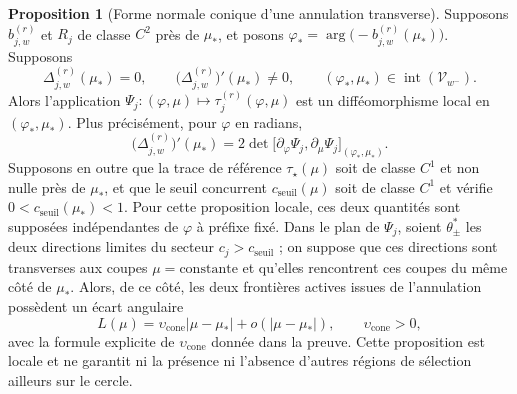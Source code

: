 \documentclass[11pt,a4paper]{article}
\theoremstyle{definition}
\newtheorem{propositionthm}[definition]{Proposition}
\theoremstyle{remark}
\begin{document}
\begin{propositionthm}[Forme normale conique d'une annulation transverse]
\label{prop:annulation-conique}
Supposons $b_{j,w}^{(r)}$ et $R_j$ de classe $C^2$ près de $\mu_*$, et posons $\varphi_*=\arg\!\bigl(-b_{j,w}^{(r)}(\mu_*)\bigr)$. Supposons
\[
 \Delta_{j,w}^{(r)}(\mu_*)=0,\qquad
 \bigl(\Delta_{j,w}^{(r)}\bigr)'(\mu_*)\ne0,\qquad
 (\varphi_*,\mu_*)\in\operatorname{int}(\mathcal V_{w^-}).
\]
Alors l'application $\Psi_j:(\varphi,\mu)\mapsto\tau_j^{(r)}(\varphi,\mu)$ est un difféomorphisme local en $(\varphi_*,\mu_*)$. Plus précisément, pour $\varphi$ en radians,
\[
 \boxed{\bigl(\Delta_{j,w}^{(r)}\bigr)'(\mu_*)=
 2\det\bigl[\partial_\varphi\Psi_j,\partial_\mu\Psi_j\bigr]_{(\varphi_*,\mu_*)}.}
\]
Supposons en outre que la trace de référence $\tau_\star(\mu)$ soit de classe $C^1$ et non nulle près de $\mu_*$, et que le seuil concurrent $c_{\mathrm{seuil}}(\mu)$ soit de classe $C^1$ et vérifie $0<c_{\mathrm{seuil}}(\mu_*)<1$. Pour cette proposition locale, ces deux quantités sont supposées indépendantes de $\varphi$ à préfixe fixé. Dans le plan de $\Psi_j$, soient $\theta_\pm^*$ les deux directions limites du secteur $c_j>c_{\mathrm{seuil}}$ ; on suppose que ces directions sont transverses aux coupes $\mu=\mathrm{constante}$ et qu'elles rencontrent ces coupes du même côté de $\mu_*$. Alors, de ce côté, les deux frontières actives issues de l'annulation possèdent un écart angulaire
\[
 \boxed{L(\mu)=\upsilon_{\mathrm{cone}}|\mu-\mu_*|
 +o(|\mu-\mu_*|),\qquad \upsilon_{\mathrm{cone}}>0,}
\]
avec la formule explicite de $\upsilon_{\mathrm{cone}}$ donnée dans la preuve. Cette proposition est locale et ne garantit ni la présence ni l'absence d'autres régions de sélection ailleurs sur le cercle.
\end{propositionthm}
\end{document}
